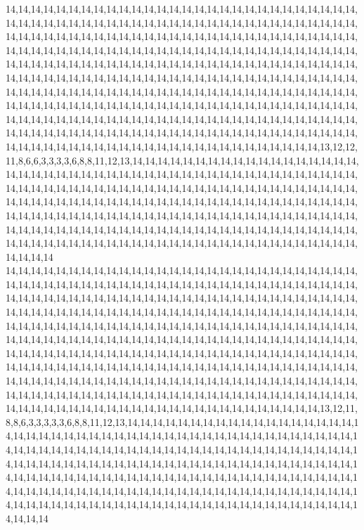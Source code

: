 14,14,14,14,14,14,14,14,14,14,14,14,14,14,14,14,14,14,14,14,14,14,14,14,14,14,14,14,14,14,14,14,14,14,14,14,14,14,14,14,14,14,14,14,14,14,14,14,14,14,14,14,14,14,14,14,14,14,14,14,14,14,14,14,14,14,14,14,14,14,14,14,14,14,14,14,14,14,14,14,14,14,14,14,14,14,14,14,14,14,14,14,14,14,14,14,14,14,14,14,14,14,14,14,14,14,14,14,14,14,14,14,14,14,14,14,14,14,14,14,14,14,14,14,14,14,14,14,14,14,14,14,14,14,14,14,14,14,14,14,14,14,14,14,14,14,14,14,14,14,14,14,14,14,14,14,14,14,14,14,14,14,14,14,14,14,14,14,14,14,14,14,14,14,14,14,14,14,14,14,14,14,14,14,14,14,14,14,14,14,14,14,14,14,14,14,14,14,14,14,14,14,14,14,14,14,14,14,14,14,14,14,14,14,14,14,14,14,14,14,14,14,14,14,14,14,14,14,14,14,14,14,14,14,14,14,14,14,14,14,14,14,14,14,14,14,14,14,14,14,14,14,14,14,14,14,14,14,14,14,14,14,14,14,14,14,14,14,14,14,14,14,14,14,14,14,14,14,14,14,14,14,14,14,14,14,14,14,14,14,14,14,14,14,14,14,14,14,14,14,14,14,14,14,14,13,12,12,11,8,6,6,3,3,3,3,6,8,8,11,12,13,14,14,14,14,14,14,14,14,14,14,14,14,14,14,14,14,14,14,14,14,14,14,14,14,14,14,14,14,14,14,14,14,14,14,14,14,14,14,14,14,14,14,14,14,14,14,14,14,14,14,14,14,14,14,14,14,14,14,14,14,14,14,14,14,14,14,14,14,14,14,14,14,14,14,14,14,14,14,14,14,14,14,14,14,14,14,14,14,14,14,14,14,14,14,14,14,14,14,14,14,14,14,14,14,14,14,14,14,14,14,14,14,14,14,14,14,14,14,14,14,14,14,14,14,14,14,14,14,14,14,14,14,14,14,14,14,14,14,14,14,14,14,14,14,14,14,14,14,14,14,14,14,14,14,14,14,14,14,14,14,14,14,14,14,14,14,14,14,14,14,14,14,14,14,14,14,14,14,14,14,14,14,14,14,14,14,14,14,14,14
14,14,14,14,14,14,14,14,14,14,14,14,14,14,14,14,14,14,14,14,14,14,14,14,14,14,14,14,14,14,14,14,14,14,14,14,14,14,14,14,14,14,14,14,14,14,14,14,14,14,14,14,14,14,14,14,14,14,14,14,14,14,14,14,14,14,14,14,14,14,14,14,14,14,14,14,14,14,14,14,14,14,14,14,14,14,14,14,14,14,14,14,14,14,14,14,14,14,14,14,14,14,14,14,14,14,14,14,14,14,14,14,14,14,14,14,14,14,14,14,14,14,14,14,14,14,14,14,14,14,14,14,14,14,14,14,14,14,14,14,14,14,14,14,14,14,14,14,14,14,14,14,14,14,14,14,14,14,14,14,14,14,14,14,14,14,14,14,14,14,14,14,14,14,14,14,14,14,14,14,14,14,14,14,14,14,14,14,14,14,14,14,14,14,14,14,14,14,14,14,14,14,14,14,14,14,14,14,14,14,14,14,14,14,14,14,14,14,14,14,14,14,14,14,14,14,14,14,14,14,14,14,14,14,14,14,14,14,14,14,14,14,14,14,14,14,14,14,14,14,14,14,14,14,14,14,14,14,14,14,14,14,14,14,14,14,14,14,14,14,14,14,14,14,14,14,14,14,14,14,14,14,14,14,14,14,14,14,14,14,14,14,14,14,14,14,14,14,14,14,14,14,14,14,14,13,12,11,8,8,6,3,3,3,3,3,6,8,8,11,12,13,14,14,14,14,14,14,14,14,14,14,14,14,14,14,14,14,14,14,14,14,14,14,14,14,14,14,14,14,14,14,14,14,14,14,14,14,14,14,14,14,14,14,14,14,14,14,14,14,14,14,14,14,14,14,14,14,14,14,14,14,14,14,14,14,14,14,14,14,14,14,14,14,14,14,14,14,14,14,14,14,14,14,14,14,14,14,14,14,14,14,14,14,14,14,14,14,14,14,14,14,14,14,14,14,14,14,14,14,14,14,14,14,14,14,14,14,14,14,14,14,14,14,14,14,14,14,14,14,14,14,14,14,14,14,14,14,14,14,14,14,14,14,14,14,14,14,14,14,14,14,14,14,14,14,14,14,14,14,14,14,14,14,14,14,14,14,14,14,14,14,14,14,14,14,14,14,14,14,14,14,14,14,14,14,14,14,14,14,14,14

